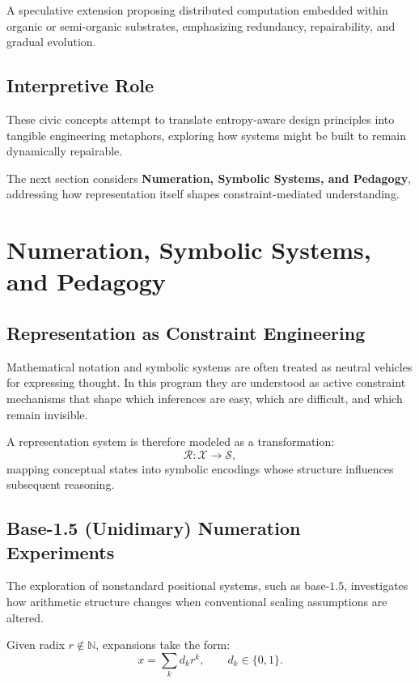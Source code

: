 \documentclass[12pt]{article}
\begin{document}
A speculative extension proposing distributed computation embedded within organic or semi-organic substrates, emphasizing redundancy, repairability, and gradual evolution.

\subsection{Interpretive Role}

These civic concepts attempt to translate entropy-aware design principles into tangible engineering metaphors, exploring how systems might be built to remain dynamically repairable.

\bigskip

The next section considers \textbf{Numeration, Symbolic Systems, and Pedagogy}, addressing how representation itself shapes constraint-mediated understanding.

\section{Numeration, Symbolic Systems, and Pedagogy}

\subsection{Representation as Constraint Engineering}

Mathematical notation and symbolic systems are often treated as neutral vehicles for expressing thought. In this program they are understood as active constraint mechanisms that shape which inferences are easy, which are difficult, and which remain invisible.

A representation system is therefore modeled as a transformation:
\[
\mathcal{R} : \mathcal{X} \longrightarrow \mathcal{S},
\]
mapping conceptual states into symbolic encodings whose structure influences subsequent reasoning.

\subsection{Base-1.5 (Unidimary) Numeration Experiments}

The exploration of nonstandard positional systems, such as base-$1.5$, investigates how arithmetic structure changes when conventional scaling assumptions are altered.

Given radix $r\notin\mathbb{N}$, expansions take the form:
\[
x=\sum_{k} d_k r^k,\qquad d_k\in\{0,1\}.
\]
\end{document}
